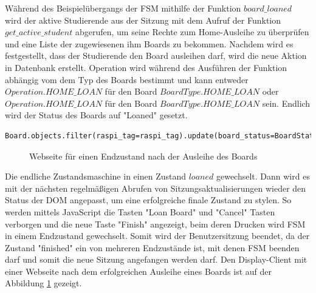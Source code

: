 Während des Beispielübergangs der FSM mithilfe der Funktion $board\_loaned$ wird der aktive Studierende aus der Sitzung mit dem Aufruf der Funktion $get\_active\_student$ abgerufen, um seine Rechte zum Home-Ausleihe zu überprüfen und eine Liste der zugewiesenen ihm Boards zu bekommen. Nachdem wird es festgestellt, dass der Studierende den Board ausleihen darf, wird die neue Aktion in Datenbank erstellt. Operation wird während des Ausführen der Funktion abhängig vom dem Typ des Boards bestimmt und kann entweder $Operation.HOME\_LOAN$ für den Board $BoardType.HOME\_LOAN$ oder $Operation.HOME\_LOAN$ für den Board $BoardType.HOME\_LOAN$ sein. Endlich wird der Status des Boards auf "Loaned" gesetzt. 
\begin{lstlisting}[caption={[Änderung des Statuses von active zu loaned] },captionpos=b]
Board.objects.filter(raspi_tag=raspi_tag).update(board_status=BoardStatus.LOANED)
\end{lstlisting}
\begin{figure}[hb!]
	\centering
	\caption{Webseite für einen Endzustand nach der Ausleihe des Boards}
	\label{fig:fsmend}
\end{figure} 
Die endliche Zustandsmaschine in einen Zustand $loaned$ gewechselt. Dann wird es mit der nächsten regelmäßigen Abrufen von Sitzungsaktualisierungen wieder den Status der DOM angepasst, um eine erfolgreiche finale Zustand zu stylen. So werden mittels JavaScript die Tasten "Loan Board" und "Cancel" Tasten verborgen und die neue Taste "Finish" angezeigt, beim deren Drucken wird FSM in einem Endzustand gewechselt. Somit wird der Benutzersitzung beendet, da der Zustand "finished" ein von mehreren Endzustände ist, mit denen FSM beenden darf und somit die neue Sitzung angefangen werden darf. Den Display-Client mit einer Webseite nach dem erfolgreichen Ausleihe eines Boards ist auf der Abbildung \ref{fig:fsmend} gezeigt.

